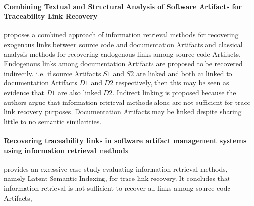 \paragraph*{Combining Textual and Structural Analysis of Software Artifacts for  Traceability Link Recovery}
\cite{McMillanPR2009}
proposes a combined approach of information retrieval methods for recovering exogenous links between source code and documentation \glspl{Artifact} and classical analysis methods for recovering endogenous links among source code \glspl{Artifact}.
Endogenous links among documentation \glspl{Artifact} are proposed to be recovered indirectly, i.e. if source \glspl{Artifact} $S1$ and $S2$ are linked and both ar linked to documentation \glspl{Artifact} $D1$ and $D2$ respectively, then this may be seen as evidence that $D1$ are also linked $D2$.
Indirect linking is proposed because the authors argue that information retrieval methods alone are not sufficient for trace link recovery purposes.
Documentation \glspl{Artifact} may be linked despite sharing little to no semantic similarities.





\paragraph*{Recovering traceability links in software artifact management systems using information retrieval methods}
\cite{Lucia:2007:RTL:1276933.1276934}
provides an excessive case-study evaluating information retrieval methods, namely Latent Semantic Indexing, for trace link recovery.
It concludes that information retrieval is not sufficient to recover all links among source code \glspl{Artifact}, 

